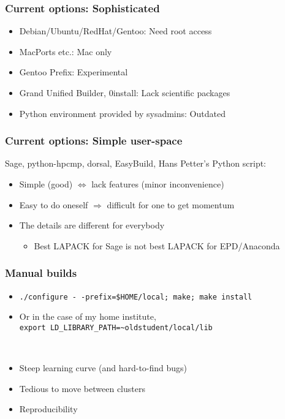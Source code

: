 \documentclass[sans,mathserif]{beamer}
\begin{document}
\begin{frame}
  \frametitle{Current options: Sophisticated}

  \begin{itemize}
  \item<+-> Debian/Ubuntu/RedHat/Gentoo: Need root access
  \item<+-> MacPorts etc.: Mac only
  \item<+-> Gentoo Prefix: Experimental
  \item<+-> Grand Unified Builder, 0install: Lack scientific packages
  \item<+-> Python environment provided by sysadmins: Outdated
  \end{itemize}

\end{frame}

\begin{frame}
  \frametitle{Current options: Simple user-space}
  Sage, python-hpcmp, dorsal, EasyBuild, Hans Petter's Python script:

  \begin{itemize}
  \item<+-> Simple (good) $\Leftrightarrow$ lack features (minor inconvenience)
  \item<+-> Easy to do oneself $\Rightarrow$ difficult for one to get
    momentum
  \item<+-> The details are different for everybody
   \begin{itemize}
    \item Best LAPACK for Sage is not best LAPACK for EPD/Anaconda
    \end{itemize}
  \end{itemize}
\end{frame}

\begin{frame}
  \frametitle{Manual builds}

  \begin{itemize}
  \item<+-> {\tt ./configure -\,{}-prefix=\$HOME/local; make; make install}
  \item<+->{Or in the case of my home institute,\\
{\tt export LD\_LIBRARY\_PATH=\textasciitilde{}oldstudent/local/lib}}
  \end{itemize}

~


\begin{itemize}
\item<+-> Steep learning curve (and hard-to-find bugs)
\item<+-> Tedious to move between clusters
\item<+-> Reproducibility 
\end{itemize}
\end{frame}
\end{document}

